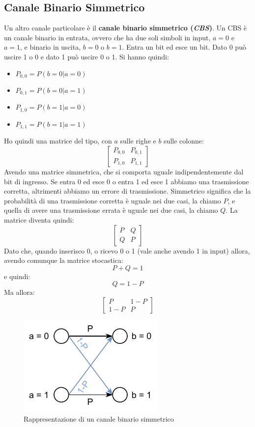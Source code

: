 \documentclass[a4paper,12pt, oneside]{book}
\begin{document}
\subsection{Canale Binario Simmetrico}
Un altro canale particolare è il \textbf{canale binario simmetrico
  (\textit{CBS})}. Un CBS è un canale binario in entrata, ovvero che ha due soli
simboli in input, $a=0$ e $a=1$, e binario in uscita, $b=0$ o $b=1$. Entra un
bit ed esce un bit. Dato 0 può uscire 1 o 0 e dato 1 può uscire 0 o 1. Si hanno
quindi:
\begin{itemize}
  \item $P_{0,0}= P(b=0|a=0)$
  \item $P_{0,1}=P(b=0|a=1)$
  \item $P_{1,0}=P(b=1|a=0)$
  \item $P_{1,1}=P(b=1|a=1)$
\end{itemize}
Ho quindi una matrice del tipo, con $a$ sulle righe e $b$ sulle colonne:
\[\left[
  \begin{matrix}
    P_{0,0} & P_{0,1}\\
    P_{1,0} & P_{1,1}
  \end{matrix}
  \right]
\]
Avendo una matrice simmetrica, che si comporta uguale indipendentemente dal bit
di ingresso. Se entra 0 ed esce 0 o entra 1 ed esce 1 abbiamo una trasmissione
corretta, altrimenti abbiamo un errore di trasmissione. Simmetrico significa che
la probabilità di una trasmissione corretta è uguale nei due casi, la chiamo
$P$, e quella di 
avere una trasmissione errata è uguale nei due casi, la chiamo $Q$. La matrice
diventa quindi:
\[\left[
  \begin{matrix}
    P & Q\\
    Q & P
  \end{matrix}
  \right]
\]
Dato che, quando inserisco 0, o ricevo 0 o 1 (vale anche avendo 1 in input)
allora, avendo comunque la matrice stocastica: 
\[P+Q=1\]
e quindi:
\[Q=1-P\]
Ma allora:
\[\left[
  \begin{matrix}
    P & 1-P\\
    1-P & P
  \end{matrix}
  \right]
\]
\begin{figure}
  \centering
  \includegraphics[scale = 1.2]{img/cbs.pdf}
  \caption{Rappresentazione di un canale binario simmetrico}
  \label{fig:cbs}
\end{figure}
\end{document}
